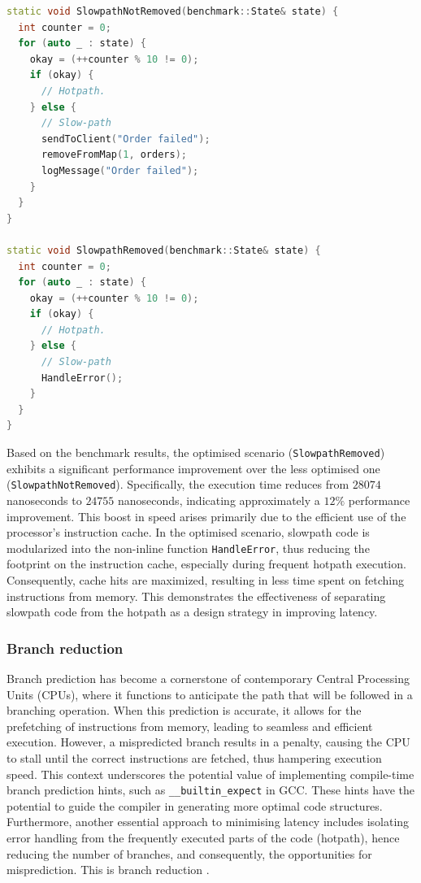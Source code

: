 \documentclass{article}
\theoremstyle{break}
\begin{document}
\begin{lstlisting}[style=customc++, language=C++, caption={Slowpath removed Google Benchmark}]
static void SlowpathNotRemoved(benchmark::State& state) {
  int counter = 0;
  for (auto _ : state) {
    okay = (++counter % 10 != 0);
    if (okay) {
      // Hotpath.
    } else {
      // Slow-path
      sendToClient("Order failed");
      removeFromMap(1, orders);
      logMessage("Order failed");
    }
  }
}

static void SlowpathRemoved(benchmark::State& state) {
  int counter = 0;
  for (auto _ : state) {
    okay = (++counter % 10 != 0);
    if (okay) {
      // Hotpath.
    } else {
      // Slow-path
      HandleError();
    }
  }
}
\end{lstlisting}


Based on the benchmark results, the optimised scenario (\texttt{SlowpathRemoved}) exhibits a significant performance improvement over the less optimised one (\texttt{Sl\-owpathNotRemoved}). Specifically, the execution time reduces from \(28074\) nanoseconds to \(24755\) nanoseconds, indicating approximately a \(12\%\) performance improvement. This boost in speed arises primarily due to the efficient use of the processor's instruction cache. In the optimised scenario, slowpath code is modularized into the non-inline function \texttt{HandleError}, thus reducing the footprint on the instruction cache, especially during frequent hotpath execution. Consequently, cache hits are maximized, resulting in less time spent on fetching instructions from memory. This demonstrates the effectiveness of separating slowpath code from the hotpath as a design strategy in improving latency.


\subsubsection*{Branch reduction}
Branch prediction has become a cornerstone of contemporary Central Processing Units (CPUs), where it functions to anticipate the path that will be followed in a branching operation. When this prediction is accurate, it allows for the prefetching of instructions from memory, leading to seamless and efficient execution. However, a mispredicted branch results in a penalty, causing the CPU to stall until the correct instructions are fetched, thus hampering execution speed. This context underscores the potential value of implementing compile-time branch prediction hints, such as \texttt{\_\_builtin\_expect} in GCC. These hints have the potential to guide the compiler in generating more optimal code structures. Furthermore, another essential approach to minimising latency includes isolating error handling from the frequently executed parts of the code (hotpath), hence reducing the number of branches, and consequently, the opportunities for misprediction. This is branch reduction \cite{8}.
\end{document}
